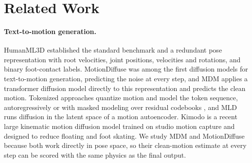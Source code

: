\section{Related Work}
\label{sec:related}

\paragraph{Text-to-motion generation.}
HumanML3D \citep{guo2022humanml3d} established the standard benchmark and a redundant pose representation with root velocities, joint positions, velocities and rotations, and binary foot-contact labels. MotionDiffuse \citep{zhang2022motiondiffuse} was among the first diffusion models for text-to-motion generation, predicting the noise at every step, and MDM \citep{tevet2023mdm} applies a transformer diffusion model directly to this representation and predicts the clean motion. Tokenized approaches quantize motion and model the token sequence, autoregressively \citep{zhang2023t2mgpt} or with masked modeling over residual codebooks \citep{guo2024momask}, and MLD \citep{chen2023mld} runs diffusion in the latent space of a motion autoencoder. Kimodo \citep{rempe2026kimodo} is a recent large kinematic motion diffusion model trained on studio motion capture and designed to reduce floating and foot skating. We study MDM and MotionDiffuse because both work directly in pose space, so their clean-motion estimate at every step can be scored with the same physics as the final output.

